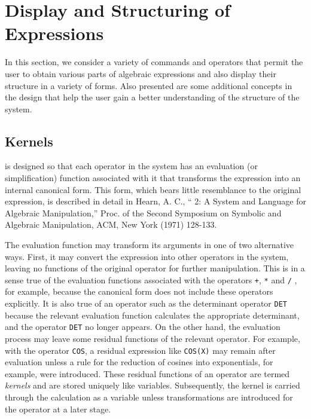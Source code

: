 \chapter{Display and Structuring of Expressions}
In this section, we consider a variety of commands and operators that
permit the user to obtain various parts of algebraic expressions and also
display their structure in a variety of forms. Also presented are some
additional concepts in the {\REDUCE} design that help the user gain a better
understanding of the structure of the system.

\section{Kernels}
{\REDUCE} is designed so that each operator in the system has an
evaluation (or simplification) function associated
with it that transforms the expression into an internal canonical form.
  This form, which bears little resemblance to the
original expression, is described in detail in Hearn, A. C., ``{\REDUCE} 2:
A System and Language for Algebraic Manipulation,'' Proc. of the Second
Symposium on Symbolic and Algebraic Manipulation, ACM, New York (1971)
128-133.

The evaluation function may transform its arguments in one of two
alternative ways.  First, it may convert the expression into other
operators in the system, leaving no functions of the original operator for
further manipulation.  This is in a sense true of the evaluation functions
associated with the operators \texttt{+}, \texttt{*} and \texttt{/} , for example,
because the canonical form does not include these
operators explicitly.  It is also true of an operator such as the
determinant operator \texttt{DET} because the relevant
evaluation function calculates the appropriate determinant, and the
operator \texttt{DET} no longer appears.  On the other hand, the evaluation
process may leave some residual functions of the relevant operator.  For
example, with the operator \texttt{COS}, a residual expression like
\texttt{COS(X)} may remain after evaluation unless a rule for the reduction of
cosines into exponentials, for example, were introduced.  These residual
functions of an operator are termed \emph{kernels} and are
stored uniquely like variables.  Subsequently, the kernel is carried
through the calculation as a variable unless transformations are
introduced for the operator at a later stage.

